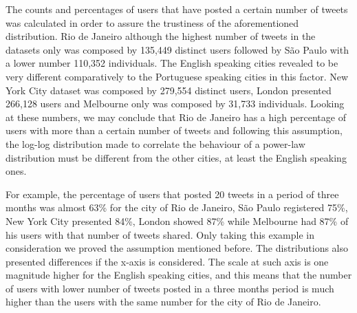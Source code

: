 The counts and percentages of users that have posted a certain number of tweets was calculated in order to assure the trustiness of the aforementioned distribution. Rio de Janeiro although the highest number of tweets in the datasets only was composed by 135,449 distinct users followed by São Paulo with a lower number 110,352 individuals. The English speaking cities revealed to be very different comparatively to the Portuguese speaking cities in this factor. New York City dataset was composed by 279,554 distinct users, London presented 266,128 users and Melbourne only was composed by 31,733 individuals. Looking at these numbers, we may conclude that Rio de Janeiro has a high percentage of users with more than a certain number of tweets and following this assumption, the log-log distribution made to correlate the behaviour of a power-law distribution must be different from the other cities, at least the English speaking ones.

For example, the percentage of users that posted 20 tweets in a period of three months was almost 63\% for the city of Rio de Janeiro, São Paulo registered 75\%, New York City presented 84\%, London showed 87\% while Melbourne had 87\% of his users with that number of tweets shared. Only taking this example in consideration we proved the assumption mentioned before. The distributions also presented differences if the x-axis is considered. The scale at such axis is one magnitude higher for the English speaking cities, and this means that the number of users with lower number of tweets posted in a three months period is much higher than the users with the same number for the city of Rio de Janeiro.

